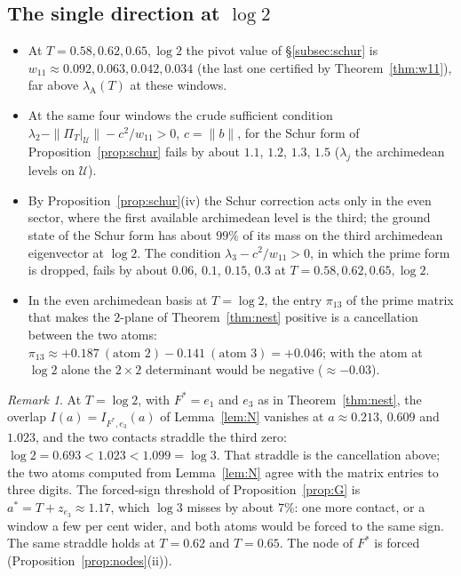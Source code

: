 \documentclass[11pt]{amsart}
\theoremstyle{definition}
\theoremstyle{remark}
\newtheorem{remark}[theorem]{Remark}
\newcommand{\lamA}{\lambda_{\mathrm A}(T)}
\newcommand{\PiT}{\Pi_T}
\begin{document}
\subsection{The single direction at \texorpdfstring{$\log2$}{log 2}}
\begin{itemize}
\item At $T=0.58,0.62,0.65,\log2$ the pivot value of \S\ref{subsec:schur} is $w_{11}\approx0.092,0.063,0.042,0.034$ (the
last one certified by Theorem~\ref{thm:w11}), far above $\lamA$ at these windows.
\item At the same four windows the crude sufficient condition $\lambda_2-\|\PiT|_{\mathcal U}\|-c^2/w_{11}>0$, $c=\|b\|$, for
the Schur form of Proposition~\ref{prop:schur} fails by about $1.1$, $1.2$, $1.3$, $1.5$ ($\lambda_j$ the archimedean levels on
$\mathcal U$).
\item By Proposition~\ref{prop:schur}(iv) the Schur correction acts only in the even sector, where the first available
archimedean level is the third; the ground state of the Schur form has about $99\%$ of its mass on the third
archimedean eigenvector at $\log2$. The condition $\lambda_3-c^2/w_{11}>0$, in which the prime form is dropped, fails by
about $0.06$, $0.1$, $0.15$, $0.3$ at $T=0.58,0.62,0.65,\log2$.
\item In the even archimedean basis at $T=\log2$, the entry $\pi_{13}$ of the prime matrix that makes the $2$-plane of
Theorem~\ref{thm:nest} positive is a cancellation between the two atoms: $\pi_{13}\approx+0.187\ (\text{atom }2)-0.141\
(\text{atom }3)=+0.046$; with the atom at $\log2$ alone the $2\times2$ determinant would be negative ($\approx-0.03$).
\end{itemize}

\begin{remark}\label{rem:nodal}
At $T=\log2$, with $F^*=e_1$ and $e_3$ as in Theorem~\ref{thm:nest}, the overlap $I(a)=I_{F^*,e_3}(a)$ of
Lemma~\ref{lem:N} vanishes at $a\approx0.213$, $0.609$ and $1.023$, and the two contacts straddle the third zero:
$\log2=0.693<1.023<1.099=\log3$. That straddle is the cancellation above; the two atoms computed from
Lemma~\ref{lem:N} agree with the matrix entries to three digits. The forced-sign threshold of Proposition~\ref{prop:G}
is $a^*=T+z_{e_3}\approx1.17$, which $\log3$ misses by about $7\%$: one more contact, or a window a few per cent wider,
and both atoms would be forced to the same sign. The same straddle holds at $T=0.62$ and $T=0.65$. The node of $F^*$
is forced (Proposition~\ref{prop:nodes}(ii)).
\end{remark}
\end{document}
